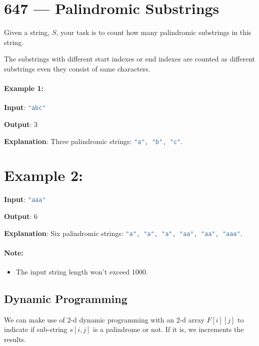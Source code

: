 \section{647 --- Palindromic Substrings}

Given a string, $S$, your task is to count how many palindromic substrings in this string.

The substrings with different start indexes or end indexes are counted as different substrings even they consist of same characters.

\paragraph{Example 1:}
\begin{flushleft}
\textbf{Input}: \lstinline[language=C++, basicstyle=\small\ttfamily, keywordstyle=\bfseries\color{green!40!black}]|"abc"|

\textbf{Output}: 3

\textbf{Explanation}: Three palindromic strings: \lstinline[language=C++, basicstyle=\small\ttfamily, keywordstyle=\bfseries\color{green!40!black}]|"a", "b", "c"|.
\end{flushleft}
 

\section{Example 2:}
\begin{flushleft}
\textbf{Input}: \lstinline[language=C++, basicstyle=\small\ttfamily, keywordstyle=\bfseries\color{green!40!black}]|"aaa"|

\textbf{Output}: 6

\textbf{Explanation}: Six palindromic strings: \lstinline[language=C++, basicstyle=\small\ttfamily, keywordstyle=\bfseries\color{green!40!black}]|"a", "a", "a", "aa", "aa", "aaa"|.
\end{flushleft}
 

\paragraph{Note:}
\begin{itemize}
    \item The input string length won't exceed 1000.
\end{itemize}

\subsection{Dynamic Programming}
We can make use of 2-d dynamic programming with an 2-d array $F[i][j]$ to indicate if sub-string $s[i,j]$ is a palindrome or not. If it is, we increments the results.

